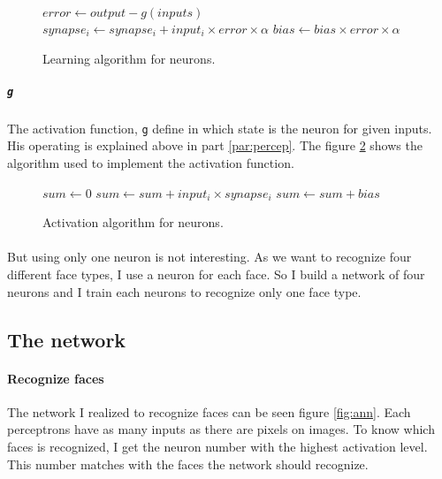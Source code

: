 \begin{figure}[!h]
    \begin{algorithmic}
        \State $error \gets output - g(inputs)$
            \State $ synapse_i \gets synapse_i + input_i \times error \times \alpha $
        \EndFor
        \State $bias \gets bias \times error \times \alpha $
     \EndFunction
    \end{algorithmic}
    \caption{\label{fig:algo_learn} Learning algorithm for neurons.}
\end{figure}

    \subparagraph{\texttt{g}}{
     The activation function, \texttt{g} define in which state is the neuron
 for given inputs. His operating is explained above in part \ref{par:percep}.
 The figure \ref{fig:algo_g} shows the algorithm used to implement the activation
 function.
}

\begin{figure}[!h]
    \begin{algorithmic}
        \State $sum \gets 0$
            \State $ sum \gets sum + input_i \times synapse_i $
        \EndFor
        \State $ sum \gets sum + bias $
        \State \Return {}
     \EndFunction
    \end{algorithmic}
    \caption{\label{fig:algo_g} Activation algorithm for neurons.}
\end{figure}


\paragraph{}{
    But using only one neuron is not interesting. As we want to recognize four
 different face types, I use a neuron for each face. So I build a network of 
 four neurons and I train each neurons to recognize only one face type.
}

\subsection{The network}

\paragraph{Recognize faces}{
    The network I realized to recognize faces can be seen figure \ref{fig:ann}.
 Each perceptrons have as many inputs as there are pixels on images. To know
 which faces is recognized, I get the neuron number with the highest activation
 level. This number matches with the faces the network should recognize.
}

